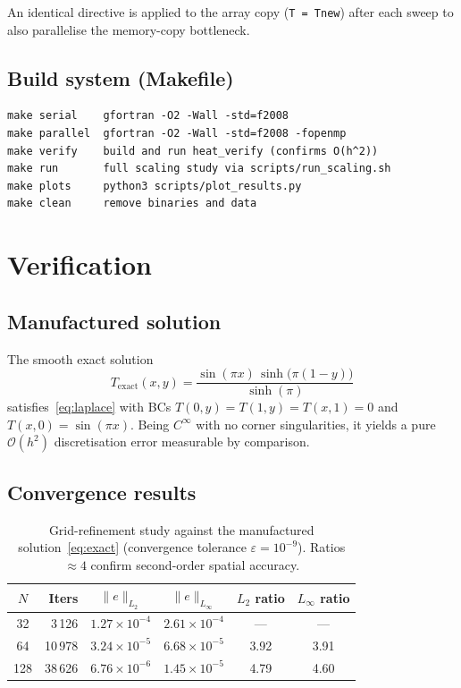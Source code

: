 \documentclass[12pt,a4paper]{article}
\begin{document}
An identical directive is applied to the array copy (\texttt{T = Tnew}) after
each sweep to also parallelise the memory-copy bottleneck.

\subsection{Build system (Makefile)}
\begin{verbatim}
make serial    gfortran -O2 -Wall -std=f2008
make parallel  gfortran -O2 -Wall -std=f2008 -fopenmp
make verify    build and run heat_verify (confirms O(h^2))
make run       full scaling study via scripts/run_scaling.sh
make plots     python3 scripts/plot_results.py
make clean     remove binaries and data
\end{verbatim}

\section{Verification}

\subsection{Manufactured solution}
The smooth exact solution
\begin{equation}
  T_{\text{exact}}(x,y)=
  \frac{\sin(\pi x)\,\sinh\!\bigl(\pi(1-y)\bigr)}{\sinh(\pi)}
  \label{eq:exact}
\end{equation}
satisfies~\eqref{eq:laplace} with BCs $T(0,y)=T(1,y)=T(x,1)=0$ and
$T(x,0)=\sin(\pi x)$.
Being $C^\infty$ with no corner singularities, it yields a pure
$\mathcal{O}(h^2)$ discretisation error measurable by comparison.

\subsection{Convergence results}

\begin{table}[H]
\centering
\caption{Grid-refinement study against the manufactured solution~\eqref{eq:exact}
  (convergence tolerance $\varepsilon=10^{-9}$). Ratios $\approx4$ confirm
  second-order spatial accuracy.}
\label{tab:verify}
\begin{tabular}{crcccc}
  \toprule
  $N$ & Iters & $\|e\|_{L_2}$ & $\|e\|_{L_\infty}$
      & $L_2$ ratio & $L_\infty$ ratio \\
  \midrule
   32 &   3\,126 & $1.27\times10^{-4}$ & $2.61\times10^{-4}$ & ---  & ---  \\
   64 &  10\,978 & $3.24\times10^{-5}$ & $6.68\times10^{-5}$ & 3.92 & 3.91 \\
  128 &  38\,626 & $6.76\times10^{-6}$ & $1.45\times10^{-5}$ & 4.79 & 4.60 \\
  \bottomrule
\end{tabular}
\end{table}
\end{document}
